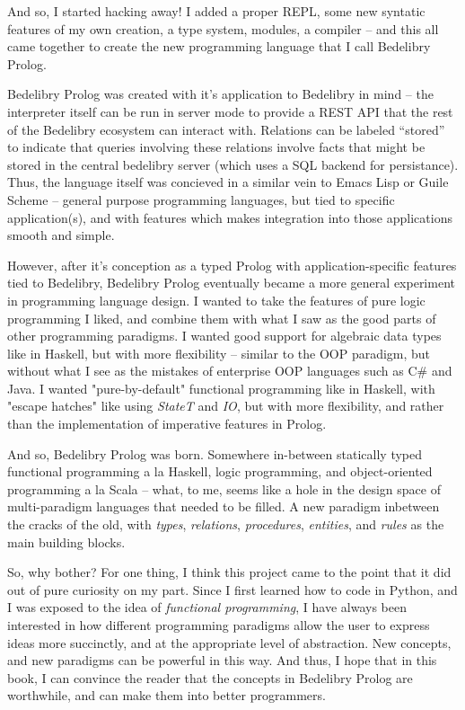 \documentclass{book}
\begin{document}
And so, I started hacking away! I added a proper REPL, some new syntatic features of my own creation, a type system, modules, a compiler -- and this all came together to create the new programming language that I call Bedelibry Prolog. 

Bedelibry Prolog was created with it's application to Bedelibry in mind -- the interpreter itself can be run in server mode to provide a REST API that the rest of the Bedelibry ecosystem can interact with. Relations can be labeled ``stored'' to indicate that queries involving these relations involve facts that might be stored in the central bedelibry server (which uses a SQL backend for persistance). Thus, the language itself was concieved in a similar vein to Emacs Lisp or Guile Scheme -- general purpose programming languages, but tied to specific application(s), and with features which makes integration into those applications smooth and simple. 

However, after it's conception as a typed Prolog with application-specific features tied to Bedelibry, Bedelibry Prolog eventually became a more general experiment in programming language design. I wanted to take the features of pure logic programming I liked, and combine them with what I saw as the good parts of other programming paradigms. I wanted good support for algebraic data types like in Haskell, but with more flexibility -- similar to the OOP paradigm, but without what I see as the mistakes of enterprise OOP languages such as C\# and Java. I wanted "pure-by-default" functional programming like in Haskell, with "escape hatches" like using \textit{StateT} and \textit{IO}, but with more flexibility, and rather than the implementation of imperative features in Prolog. 

And so, Bedelibry Prolog was born. Somewhere in-between statically typed functional programming a la Haskell, logic programming, and object-oriented programming a la Scala -- what, to me, seems like a hole in the design space of multi-paradigm languages that needed to be filled. A new paradigm inbetween the cracks of the old, with \textit{types}, \textit{relations}, \textit{procedures}, \textit{entities}, and \textit{rules} as the main building blocks.

So, why bother? For one thing, I think this project came to the point that it did out of pure curiosity on my part. Since I first learned how to code in Python, and I was exposed to the idea of \textit{functional programming}, I have always been interested in how different programming paradigms allow the user to express ideas more succinctly, and at the appropriate level of abstraction. New concepts, and new paradigms can be powerful in this way. And thus, I hope that in this book, I can convince the reader that the concepts in Bedelibry Prolog are worthwhile, and can make them into better programmers. 
\end{document}
